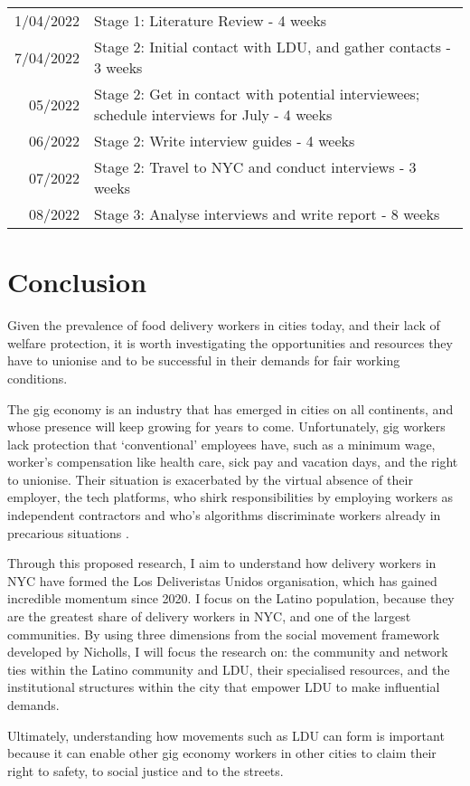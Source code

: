 \documentclass{article}[12pt]
\newcommand{\foo}{\hspace{-2.3pt}$\bullet$ \hspace{5pt}}
\begin{document}
\vspace{10mm}

\begin{tabular}{r |@{\foo} l}
1/04/2022 & Stage 1: Literature Review - 4 weeks\\
7/04/2022 & Stage 2: Initial contact with LDU, and gather contacts - 3 weeks\\
05/2022 & Stage 2: Get in contact with potential interviewees; schedule interviews for July - 4 weeks\\
06/2022 &  Stage 2: Write interview guides - 4 weeks\\
07/2022 & Stage 2: Travel to NYC and conduct interviews - 3 weeks\\
08/2022 & Stage 3: Analyse interviews and write report - 8 weeks\\
\end{tabular}

\vspace{10mm}

\section{Conclusion}

Given the prevalence of food delivery workers in cities today, and their lack of welfare protection, it is worth investigating the opportunities and resources they have to unionise and to be successful in their demands for fair working conditions.

The gig economy is an industry that has emerged in cities on all continents, and whose presence will keep growing for years to come. Unfortunately, gig workers lack protection that `conventional’ employees have, such as a minimum wage, worker’s compensation like health care, sick pay and vacation days, and the right to unionise. Their situation is exacerbated by the virtual absence of their employer, the tech platforms, who shirk responsibilities by employing workers as independent contractors and who’s algorithms discriminate workers already in precarious situations \parencite{kellogg2020algorithms}.

Through this proposed research, I aim to understand how delivery workers in NYC have formed the Los Deliveristas Unidos organisation, which has gained incredible momentum since 2020. I focus on the Latino population, because they are the greatest share of delivery workers in NYC, and one of the largest communities.
By using three dimensions from the social movement framework developed by Nicholls, I will focus the research on: the community and network ties within the Latino community and LDU, their specialised resources, and the institutional structures within the city that empower LDU to make influential demands.

Ultimately, understanding how movements such as LDU can form is important because it can enable other gig economy workers in other cities to claim their right to safety, to social justice and to the streets. 


\printbibliography
\end{document}
